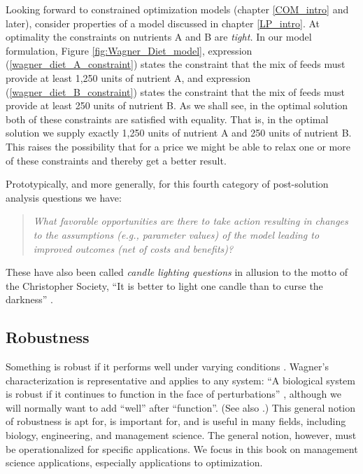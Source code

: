 Looking forward to constrained optimization models (chapter \ref{COM_intro} and later),  consider properties of a model discussed in chapter \ref{LP_intro}.
At optimality the constraints on nutrients A and B are \emph{tight.} In our model formulation, Figure \ref{fig:Wagner_Diet_model}, expression (\ref{wagner_diet_A_constraint}) states the constraint that the mix of feeds must provide at least 1,250 units of nutrient A, and expression  (\ref{wagner_diet_B_constraint}) states the constraint that the mix of feeds must provide at least 250 units of nutrient B. As we shall see, in the optimal solution both of these constraints are satisfied with equality. That is, in the optimal solution we supply exactly 1,250 units of nutrient A and 250 units of nutrient B. This raises the possibility that for a price we might be able to relax one or more of these constraints and thereby get a better result. %

Prototypically, and more generally, for this fourth category of post-solution analysis questions we have:
\begin{quote}
{\it What favorable opportunities are there to take action resulting in changes to the assumptions (e.g., parameter values) of the model leading to improved outcomes (net of costs and benefits)?}
\end{quote}
These have also been called \emph{candle lighting questions} in allusion to the motto of the Christopher Society, ``It is better to light one candle than to curse the darkness'' \cite{kimbrough-et-al-june-1992,kimbrough-oliver-pritchett_1993,kimbrough-oliver-wits_1992,kimbrough-oliver-hicss_1994,kimbrough_wood_CIST_2008}.
\label{first:candle_lighting}


\subsection{Robustness}

Something is robust if it performs well under varying conditions \cite{kimbrough_kuo_lau_2011_MIC}. Wagner's characterization is representative and applies to any system: ``A biological system is robust if it continues to function in the face of perturbations''  \cite[page 1]{wagner_andreas_2005}, although  we will normally want to add ``well'' after ``function''. (See also \cite{felix_wagner_2008,kirschner_gerhart_1998}.) This general notion of robustness is apt for, is important for, and is useful in many fields, including biology, engineering, and  management science.  The general notion, however, must be operationalized for specific applications. We focus in this book on management science applications, especially applications to optimization. 

